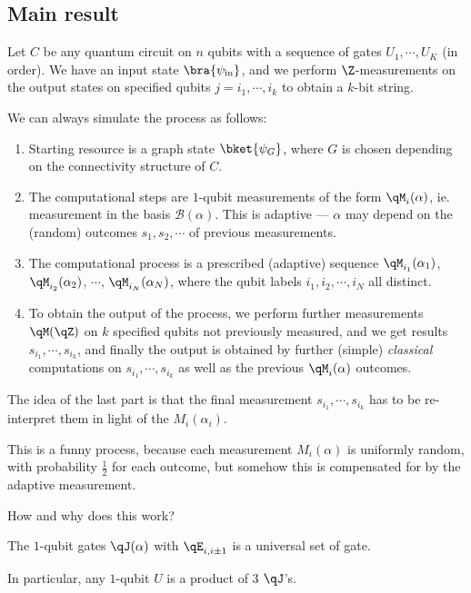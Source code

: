 \documentclass[a4paper]{article}
\begin{document}
\subsection{Main result}
\begin{thm}
  Let $C$ be any quantum circuit on $n$ qubits with a sequence of gates $U_1, \cdots, U_K$ (in order). We have an input state $\bra{\psi_{\mathrm{in}}}$, and we perform $\Z$-measurements on the output states on specified qubits $j = i_1, \cdots, i_k$ to obtain a $k$-bit string.

  We can always simulate the process as follows:
  \begin{enumerate}
    \item Starting resource is a graph state $\bket{\psi_G}$, where $G$ is chosen depending on the connectivity structure of $C$. 
    \item The computational steps are $1$-qubit measurements of the form $\qM_i(\alpha)$, ie. measurement in the basis $\mathcal{B}(\alpha)$. This is adaptive --- $\alpha$ may depend on the (random) outcomes $s_1, s_2, \cdots$ of previous measurements.
    \item The computational process is a prescribed (adaptive) sequence $\qM_{i_1}(\alpha_1)$, $\qM_{i_2}(\alpha_2)$, $\cdots$, $\qM_{i_N}(\alpha_N)$, where the qubit labels $i_1, i_2, \cdots, i_N$ all distinct.
    \item To obtain the output of the process, we perform further measurements $\qM(\qZ)$ on $k$ specified qubits not previously measured, and we get results $s_{i_1}, \cdots, s_{i_k}$, and finally the output is obtained by further (simple) \emph{classical} computations on $s_{i_1}, \cdots, s_{i_k}$ as well as the previous $\qM_i(\alpha)$ outcomes.
  \end{enumerate}
\end{thm}
The idea of the last part is that the final measurement $s_{i_1}, \cdots, s_{i_k}$ has to be re-interpret them in light of the $M_i(\alpha_i)$.

This is a funny process, because each measurement $M_i(\alpha)$ is uniformly random, with probability $\frac{1}{2}$ for each outcome, but somehow this is compensated for by the adaptive measurement.

How and why does this work?
\begin{fact}
  The $1$-qubit gates $\qJ(\alpha)$ with  $\qE_{i, i\pm 1}$ is a universal set of gate.

  In particular, any $1$-qubit $U$ is a product of $3$ $\qJ$'s. 
\end{fact}
\end{document}
